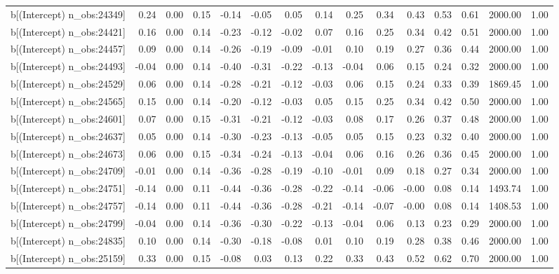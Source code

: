 \begin{table}[ht]
\begin{tabular}{rrrrrrrrrrrrrrr}
  b[(Intercept) n\_obs:24349] & 0.24 & 0.00 & 0.15 & -0.14 & -0.05 & 0.05 & 0.14 & 0.25 & 0.34 & 0.43 & 0.53 & 0.61 & 2000.00 & 1.00 \\ 
  b[(Intercept) n\_obs:24421] & 0.16 & 0.00 & 0.14 & -0.23 & -0.12 & -0.02 & 0.07 & 0.16 & 0.25 & 0.34 & 0.42 & 0.51 & 2000.00 & 1.00 \\ 
  b[(Intercept) n\_obs:24457] & 0.09 & 0.00 & 0.14 & -0.26 & -0.19 & -0.09 & -0.01 & 0.10 & 0.19 & 0.27 & 0.36 & 0.44 & 2000.00 & 1.00 \\ 
  b[(Intercept) n\_obs:24493] & -0.04 & 0.00 & 0.14 & -0.40 & -0.31 & -0.22 & -0.13 & -0.04 & 0.06 & 0.15 & 0.24 & 0.32 & 2000.00 & 1.00 \\ 
  b[(Intercept) n\_obs:24529] & 0.06 & 0.00 & 0.14 & -0.28 & -0.21 & -0.12 & -0.03 & 0.06 & 0.15 & 0.24 & 0.33 & 0.39 & 1869.45 & 1.00 \\ 
  b[(Intercept) n\_obs:24565] & 0.15 & 0.00 & 0.14 & -0.20 & -0.12 & -0.03 & 0.05 & 0.15 & 0.25 & 0.34 & 0.42 & 0.50 & 2000.00 & 1.00 \\ 
  b[(Intercept) n\_obs:24601] & 0.07 & 0.00 & 0.15 & -0.31 & -0.21 & -0.12 & -0.03 & 0.08 & 0.17 & 0.26 & 0.37 & 0.48 & 2000.00 & 1.00 \\ 
  b[(Intercept) n\_obs:24637] & 0.05 & 0.00 & 0.14 & -0.30 & -0.23 & -0.13 & -0.05 & 0.05 & 0.15 & 0.23 & 0.32 & 0.40 & 2000.00 & 1.00 \\ 
  b[(Intercept) n\_obs:24673] & 0.06 & 0.00 & 0.15 & -0.34 & -0.24 & -0.13 & -0.04 & 0.06 & 0.16 & 0.26 & 0.36 & 0.45 & 2000.00 & 1.00 \\ 
  b[(Intercept) n\_obs:24709] & -0.01 & 0.00 & 0.14 & -0.36 & -0.28 & -0.19 & -0.10 & -0.01 & 0.09 & 0.18 & 0.27 & 0.34 & 2000.00 & 1.00 \\ 
  b[(Intercept) n\_obs:24751] & -0.14 & 0.00 & 0.11 & -0.44 & -0.36 & -0.28 & -0.22 & -0.14 & -0.06 & -0.00 & 0.08 & 0.14 & 1493.74 & 1.00 \\ 
  b[(Intercept) n\_obs:24757] & -0.14 & 0.00 & 0.11 & -0.44 & -0.36 & -0.28 & -0.21 & -0.14 & -0.07 & -0.00 & 0.08 & 0.14 & 1408.53 & 1.00 \\ 
  b[(Intercept) n\_obs:24799] & -0.04 & 0.00 & 0.14 & -0.36 & -0.30 & -0.22 & -0.13 & -0.04 & 0.06 & 0.13 & 0.23 & 0.29 & 2000.00 & 1.00 \\ 
  b[(Intercept) n\_obs:24835] & 0.10 & 0.00 & 0.14 & -0.30 & -0.18 & -0.08 & 0.01 & 0.10 & 0.19 & 0.28 & 0.38 & 0.46 & 2000.00 & 1.00 \\ 
  b[(Intercept) n\_obs:25159] & 0.33 & 0.00 & 0.15 & -0.08 & 0.03 & 0.13 & 0.22 & 0.33 & 0.43 & 0.52 & 0.62 & 0.70 & 2000.00 & 1.00 \\ 

\end{tabular}
\end{table}
